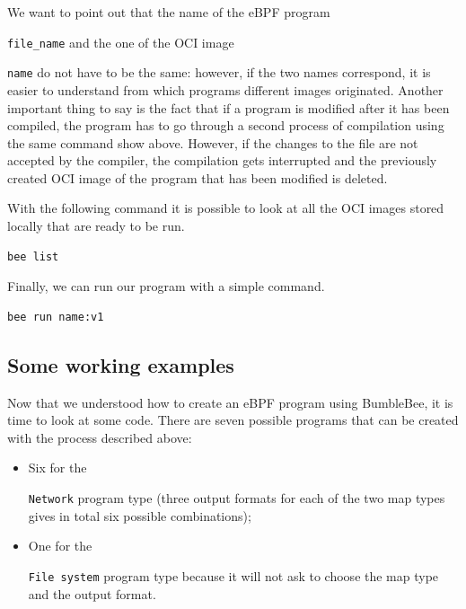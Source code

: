 We want to point out that the name of the eBPF program \raggedright\colorbox{backcolour}{\lstinline[style=commandline, language=bash]|file_name|} and the one of the OCI image \raggedright\colorbox{backcolour}{\lstinline[style=commandline, language=bash]|name|} do not have to be the same: however, if the two names correspond, it is easier to understand from which programs different images originated.
Another important thing to say is the fact that if a program is modified after it has been compiled, the program has to go through a second process of compilation using the same command show above.
However, if the changes to the file are not accepted by the compiler, the compilation gets interrupted and the previously created OCI image of the program that has been modified is deleted.

With the following command it is possible to look at all the OCI images stored locally that are ready to be run.

\begin{lstlisting}[style=commandline, language=bash, caption={\colorbox{backcolour}{\lstinline[style=commandline, language=bash]|bee|} list command.}]
	bee list
\end{lstlisting}

Finally, we can run our program with a simple command.

\begin{lstlisting}[style=commandline, language=bash, caption={\colorbox{backcolour}{\lstinline[style=commandline, language=bash]|bee|} run command.}]
	bee run name:v1
\end{lstlisting}

\subsection{Some working examples}

Now that we understood how to create an eBPF program using BumbleBee, it is time to look at some code.
There are seven possible programs that can be created with the process described above:

\begin{itemize}
	\item 
		Six for the \raggedright\colorbox{backcolour}{\lstinline[style=commandline, language=bash]|Network|} program type (three output formats for each of the two map types gives in total six possible combinations);
	\item 
		One for the \raggedright\colorbox{backcolour}{\lstinline[style=commandline, language=bash]|File system|} program type because it will not ask to choose the map type and the output format.
\end{itemize}

